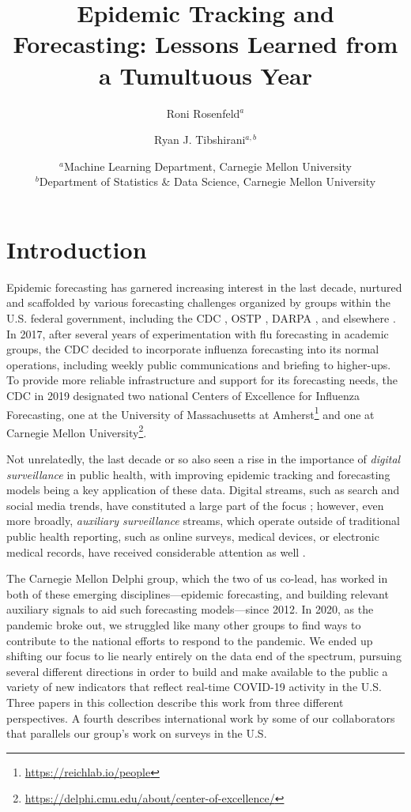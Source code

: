\documentclass{article}
\title{Epidemic Tracking and Forecasting: Lessons Learned from a Tumultuous Year}
\author{Roni Rosenfeld$^a$ \and Ryan J. Tibshirani$^{a,b}$}
\date{$^a$Machine Learning Department, Carnegie Mellon University \\ 
$^b$Department of Statistics \& Data Science, Carnegie Mellon University}
\begin{document}
\maketitle

\section{Introduction}

Epidemic forecasting has garnered increasing interest in the last decade,
nurtured and scaffolded by various forecasting challenges organized by groups
within the U.S. federal government, including the CDC \citep{Biggerstaff:2016,
  Biggerstaff:2018, Reich:2019}, OSTP \citep{Johansson:2019}, DARPA
\citep{DelValle:2018}, and elsewhere \citep{Ajelli:2018, Viboud:2018}.  In 2017,
after several years of experimentation with flu forecasting in academic groups,
the CDC decided to incorporate influenza forecasting into its normal operations,
including weekly public communications \citep{FluSight} and briefing to
higher-ups.  To provide more reliable infrastructure and support for its
forecasting needs, the CDC in 2019 designated two national Centers of Excellence
for Influenza Forecasting, one at the University of Massachusetts at
Amherst\footnote{\url{https://reichlab.io/people}} and one at Carnegie Mellon
University\footnote{\url{https://delphi.cmu.edu/about/center-of-excellence/}}. 

Not unrelatedly, the last decade or so also seen a rise in the importance of 
\emph{digital surveillance} in public health, with improving epidemic
tracking and forecasting models being a key application of these data.  Digital
streams, such as search and social media trends, have constituted a large part
of the focus \citep{Ginsberg:2009, Brownstein:2009, Salathe:2012,
Kass-Hout:2013, Santillana:2015, Paul:2017}; however, even more broadly,
\emph{auxiliary surveillance} streams, which operate outside of traditional
public health reporting, such as online surveys, medical devices, or electronic
medical records, have received considerable attention as well  
\citep{Kass-Hout:2011, Carlson:2013, Viboud:2014, Smolinski:2015,
  Santillana:2016, Charu:2017, Koppeschaar:2017, Yang:2019, Leuba:2020,
  Radin:2020, Ackley:2020}. 

The Carnegie Mellon Delphi group, which the two of us co-lead, has worked in
both of these emerging disciplines---epidemic forecasting, and building relevant
auxiliary signals to aid such forecasting models---since 2012.  In 2020, as the
pandemic broke out, we struggled like many other groups to find ways to
contribute to the national efforts to respond to the pandemic.  We ended up
shifting our focus to lie nearly entirely on the data end of the spectrum,
pursuing several different directions in order to build and make available to
the public a variety of new indicators that reflect real-time COVID-19 activity
in the U.S.  Three papers in this collection describe this work from three
different perspectives.  A fourth describes international work by some of our
collaborators that parallels our group's work on surveys in the U.S.  
\end{document}
